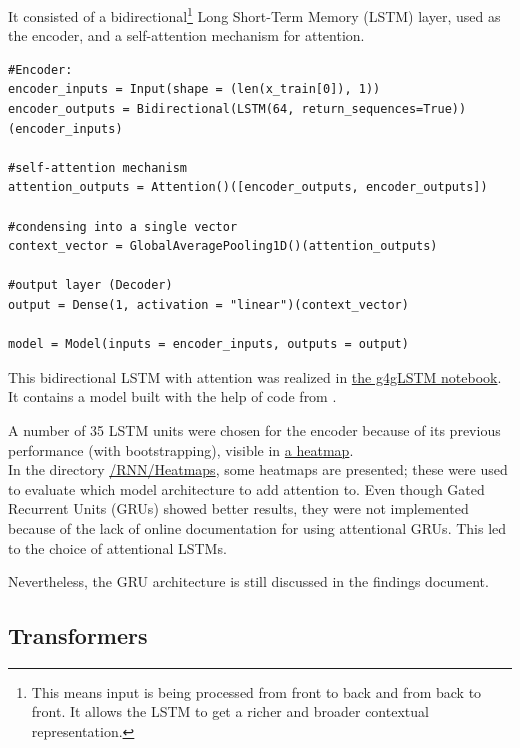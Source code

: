 \documentclass{article}
\begin{document}
It consisted of a bidirectional\footnote{This means input is being processed from front to back and from back to front. It allows the LSTM to get a richer and broader contextual representation.} Long Short-Term Memory (LSTM) layer, used as the encoder, and a self-attention mechanism for attention.

\begin{Verbatim}
#Encoder:
encoder_inputs = Input(shape = (len(x_train[0]), 1))
encoder_outputs = Bidirectional(LSTM(64, return_sequences=True))(encoder_inputs)

#self-attention mechanism
attention_outputs = Attention()([encoder_outputs, encoder_outputs])

#condensing into a single vector
context_vector = GlobalAveragePooling1D()(attention_outputs)

#output layer (Decoder)
output = Dense(1, activation = "linear")(context_vector)

model = Model(inputs = encoder_inputs, outputs = output)
\end{Verbatim}

This bidirectional LSTM with attention was realized in \href{https://github.com/AntonStantan/matura/blob/main/attentional-RNN/g4gLSTM.ipynb}{the g4gLSTM notebook}. It contains a model built with the help of code from \cite{geeksforgeeks_attention_bilstm}.

A number of 35 LSTM units were chosen for the encoder because of its previous performance (with bootstrapping), visible in \href{https://github.com/AntonStantan/matura/blob/main/attentional-RNN/previousHeatmap.png}{a heatmap}.
\\[2em]
In the directory \href{https://github.com/AntonStantan/matura/tree/main/RNN/Heatmaps}{/RNN/Heatmaps}, some heatmaps are presented; these were used to evaluate which model architecture to add attention to. Even though Gated Recurrent Units (GRUs) showed better results, they were not implemented because of the lack of online documentation for using attentional GRUs. This led to the choice of attentional LSTMs.

Nevertheless, the GRU architecture is still discussed in the findings document.
\newpage
\subsection{Transformers}
\end{document}
